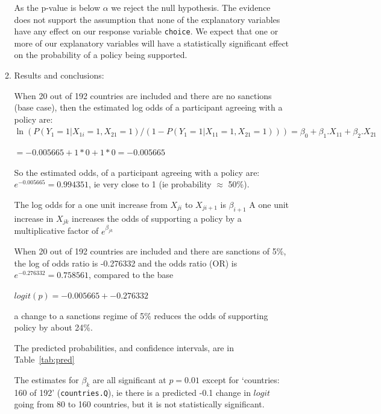 \documentclass[12pt,letterpaper]{article}
\begin{document}
\begin{enumerate}
\begin{enumerate}
      As the p-value is below $\alpha$ we reject the null hypothesis.  The evidence does not support the assumption that none of the explanatory variables have any effect on our response variable \texttt{choice}.  We expect that one or more of our explanatory variables will have a statistically significant effect on the probability of a policy being supported.

			

		\item  Results and conclusions:
		
		When 20 out of 192 countries are included and there are no sanctions (base case), then the estimated log odds of a participant agreeing with a policy are: 
		$\ln (P(Y_1 = 1|X_{1i} = 1,X_{21} = 1 ) / (1-P(Y_1 = 1|X_{11} = 1,X_{21} = 1 ))) = \beta_0 + \beta_1.X_{11} + \beta_2.X_{21} $ 
		
		$= -0.005665 + 1*0 + 1*0  = -0.005665$
		
		So the estimated odds, of a participant agreeing with a policy are:
		$e^{-0.005665} = 0.994351$, ie very close to 1 (ie probability $\approx$ 50\%). 
		
		The log odds for a one unit increase from $X_{ji}$ to $X_{ji+1}$ is $\beta_{i+1}$
		A one unit increase in $X_{jk}$ increases the odds of supporting a policy by a multiplicative factor of $e^{\beta_{jk}}$

    When 20 out of 192 countries are included and there are sanctions of 5\%, the log of odds ratio is -0.276332 and the odds ratio (OR) is $e^{-0.276332} = 0.758561$, compared to the base
    
    $logit(p) = -0.005665 + -0.276332 $
    
    a change to a sanctions regime of 5\% reduces the odds of supporting policy by about 24\%.

    The predicted probabilities, and confidence intervals, are in Table~\ref{tab:pred}

      
      
      The estimates for $\beta_k$ are all significant at $p=0.01$ except for  `countries: 160 of 192' (\texttt{countries.Q}), 
      ie there is a predicted -0.1 change in $logit$ going from 80 to 160 countries, but it is not statistically significant.
      

\end{enumerate}
\end{enumerate}
\end{document}
